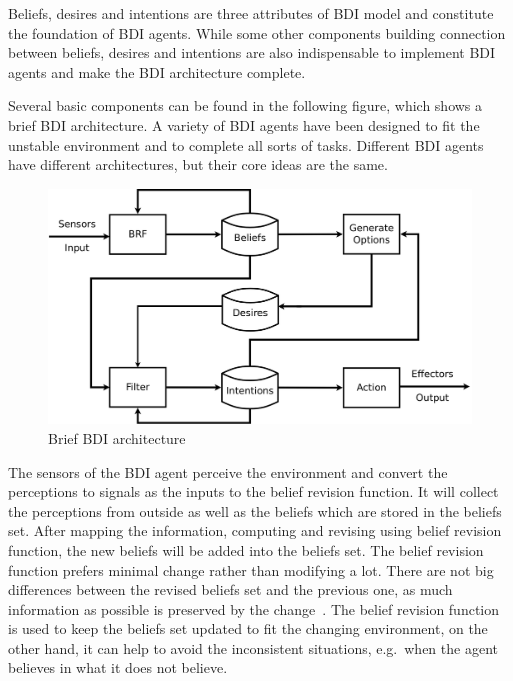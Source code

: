 Beliefs, desires and intentions are three attributes of BDI model and constitute the foundation of BDI agents.
While some other components building connection between beliefs, desires and intentions are also indispensable to implement BDI agents and make the BDI architecture complete.

Several basic components can be found in the following figure, which shows a brief BDI architecture.
A variety of BDI agents have been designed to fit the unstable environment and to complete all sorts of tasks.
Different BDI agents have different architectures, but their core ideas are the same.

\begin{figure}[htbp]
  \centering
  \includegraphics[width=\textwidth]{images/BDIAr}
  \caption{Brief BDI architecture~\cite{BDIA}}
  \label{fig:Brief BDI architecture}
\end{figure}

The sensors of the BDI agent perceive the environment and convert the perceptions to signals as the inputs to the belief revision function.
It will collect the perceptions from outside as well as the beliefs which are stored in the beliefs set.
After mapping the information, computing and revising using belief revision function, the new beliefs will be added into the beliefs set.
The belief revision function prefers minimal change rather than modifying a lot.
There are not big differences between the revised beliefs set and the previous one, as much information as possible is preserved by the change~\cite{Antje_SpatialBelief_2011}.
The belief revision function is used to keep the beliefs set updated to fit the changing environment, on the other hand, it can help to avoid the inconsistent situations, e.g.\ when the agent believes in what it does not believe.

